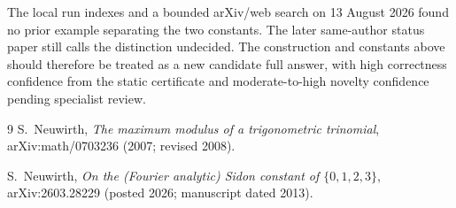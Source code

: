 \documentclass[11pt]{article}
\theoremstyle{remark}
\begin{document}
The local run indexes and a bounded arXiv/web search on 13 August 2026 found
no prior example separating the two constants.  The later same-author status
paper still calls the distinction undecided.  The construction and constants
above should therefore be treated as a new candidate full answer, with high
correctness confidence from the static certificate and moderate-to-high
novelty confidence pending specialist review.

\begin{thebibliography}{9}
S.~Neuwirth,
\emph{The maximum modulus of a trigonometric trinomial},
arXiv:math/0703236 (2007; revised 2008).

S.~Neuwirth,
\emph{On the (Fourier analytic) Sidon constant of $\{0,1,2,3\}$},
arXiv:2603.28229 (posted 2026; manuscript dated 2013).
\end{thebibliography}
\end{document}
